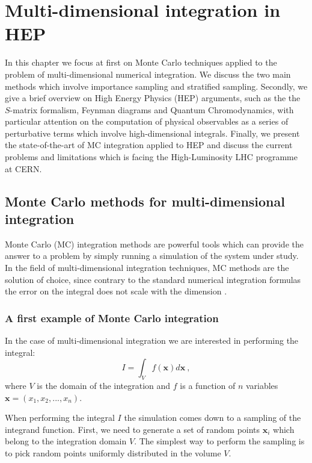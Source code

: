 \documentclass[../main/main.tex]{subfiles}
\begin{document}
\chapter[Multi-dimensional integration in HEP]{Multi-dimensional integration in HEP}
In this chapter we focus at first on Monte Carlo techniques applied to the problem of multi-dimensional numerical integration.
We discuss the two main methods which involve importance sampling and stratified sampling.
Secondly, we give a brief overview on High Energy Physics (HEP) arguments, such as the the $S$-matrix formalism, Feynman diagrams and Quantum Chromodynamics, with particular attention 
on the computation of physical observables as a series of perturbative terms which involve high-dimensional integrals.
Finally, we present the state-of-the-art of  MC integration applied to HEP and discuss the current problems and limitations which
is facing the High-Luminosity LHC programme at CERN.

\section[MC methos for multi-dimensional integration]{Monte Carlo methods for multi-dimensional integration}
Monte Carlo (MC) integration methods are powerful tools which can provide the answer to a 
problem by simply running a simulation of the system under study.
In the field of multi-dimensional integration techniques, MC methods are the solution of choice, since contrary 
to the standard numerical integration formulas  the error on the integral does not scale with the dimension \cite{Press:1992zz}. 


\subsection{A first example of Monte Carlo integration}
In the case of multi-dimensional integration we are interested in performing the
integral:
\begin{equation}
	I = \int_{V}   f(\textbf{x}) d \textbf{x} \ , 
\end{equation}
where $V$ is the domain of the integration and $f$ is a function of $n$ variables 
$\textbf{x} = (x_1,x_2, ..., x_n)$.

When performing the integral $I$ the simulation comes down to a sampling of the integrand function.
First, we need to generate a set of random points $\textbf{x}_i$ which belong to the integration domain $V$.
The simplest way to perform the sampling is to pick random points uniformly distributed 
in the volume $V$.
\end{document}
